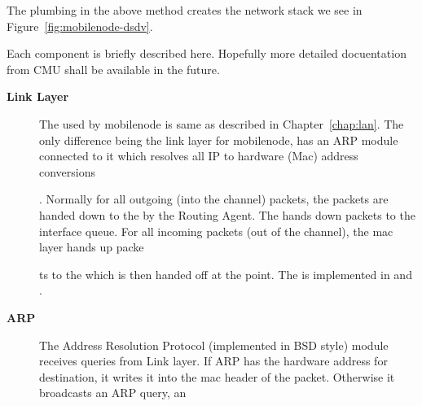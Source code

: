 The plumbing in the above method creates the network stack we see in Figure~\ref{fig:mobilenode-dsdv}.

Each component is briefly described here. Hopefully more detailed docuentation from CMU shall be available in the future.
\begin{description}
\item[{\bf Link Layer}] The  used by mobilenode is same as described in Chapter~\ref{chap:lan}. The only difference being the link layer for mobilenode, has an ARP module connected to it which resolves all IP to hardware (Mac) address conversions





















. Normally for all outgoing (into the channel) packets, the packets are handed down to the  by the Routing Agent. The  hands down packets to the interface queue. For all incoming packets (out of the channel), the mac layer hands up packe





















ts to the  which is then handed off at the  point. The  is implemented in  and .

\item [{\bf ARP}] The Address Resolution Protocol (implemented in BSD style) module receives queries from Link layer. If ARP has the hardware address for destination, it writes it into the mac header of the packet. Otherwise it broadcasts an ARP query, an






















\end{description}
